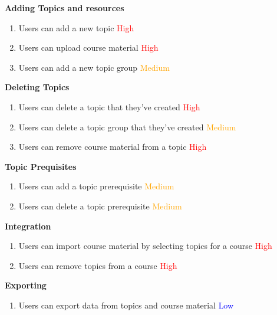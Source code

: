 \textbf{Adding Topics and resources}
    \begin{enumerate}
    \item Users can add a new topic \textcolor{Red}{High}
    \item Users can upload course material \textcolor{Red}{High}
    \item Users can add a new topic group \textcolor{Orange}{Medium}
    \end{enumerate}

\textbf{Deleting Topics}
    \begin{enumerate}
    \item Users can delete a topic that they've created \textcolor{Red}{High}
    \item Users can delete a topic group that they've created \textcolor{Orange}{Medium}
    \item Users can remove course material from a topic \textcolor{Red}{High}
    \end{enumerate}

\textbf{Topic Prequisites}
    \begin{enumerate}
    \item Users can add a topic prerequisite \textcolor{Orange}{Medium}
    \item Users can delete a topic prerequisite \textcolor{Orange}{Medium}
    \end{enumerate}

\textbf{Integration}
    \begin{enumerate}
    \item Users can import course material by selecting topics for a course \textcolor{Red}{High}
    \item Users can remove topics from a course \textcolor{Red}{High}
    \end{enumerate}

\textbf{Exporting}
    \begin{enumerate}
    \item Users can export data from topics and course material \textcolor{Blue}{Low}
    \end{enumerate}
